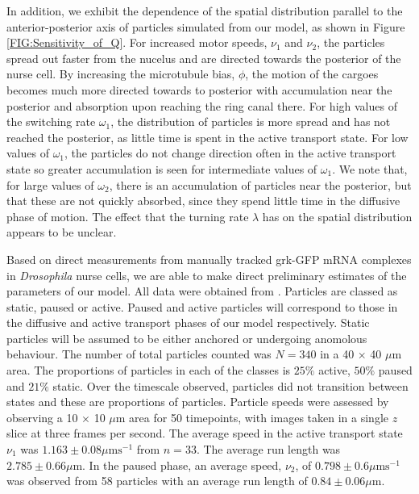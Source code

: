 \documentclass[twocolumn]{biophys}
\begin{document}
In addition, we exhibit the dependence of the spatial distribution parallel to the anterior-posterior axis of particles simulated from our model, as shown in Figure \ref{FIG:Sensitivity_of_Q}.
For increased motor speeds, $\nu_1$ and $\nu_2$, the particles spread out faster from the nucelus and are directed towards the posterior of the nurse cell.
By increasing the microtubule bias, $\phi$, the motion of the cargoes becomes much more directed towards to posterior with accumulation near the posterior and absorption upon reaching the ring canal there.
For high values of the switching rate $\omega_1$, the distribution of particles is more spread and has not reached the posterior, as little time is spent in the active transport state.
For low values of $\omega_1$, the particles do not change direction often in the active transport state so greater accumulation is seen for intermediate values of $\omega_1$.
We note that, for large values of $\omega_2$, there is an accumulation of particles near the posterior, but that these are not quickly absorbed, since they spend little time in the diffusive phase of motion.
The effect that the turning rate $\lambda$ has on the spatial distribution appears to be unclear.

Based on direct measurements from manually tracked grk-GFP mRNA complexes in \textit{Drosophila} nurse cells, we are able to make direct preliminary estimates of the parameters of our model.
All data were obtained from \citet{DavidsonPhD2015}.
Particles are classed as static, paused or active.
Paused and active particles will correspond to those in the diffusive and active transport phases of our model respectively. 
Static particles will be assumed to be either anchored or undergoing anomolous behaviour. 
The number of total particles counted was $N=340$ in a 40 $\times$ 40 $\mu \text{m}$ area.
The proportions of particles in each of the classes is $25\%$ active, $50\%$ paused and $21\%$ static. 
Over the timescale observed, particles did not transition between states and these are proportions of particles. 
Particle speeds were assessed by observing a 10 $\times$ 10 $\mu \text{m}$ area for 50 timepoints, with images taken in a single $z$ slice at three frames per second. 
The average speed in the active transport state $\nu_1 $ was  $1.163 \pm 0.08 \mu \text{ms}^{-1}$ from $n=33$. 
The average run length was $2.785 \pm 0.66 \mu \text{m}$. 
In the paused phase, an average speed, $\nu_2$, of $0.798 \pm 0.6 \mu \text{ms}^{-1}$ was observed from 58 particles with an average run length of  $0.84 \pm 0.06 \mu \text{m}$. 
\end{document}
